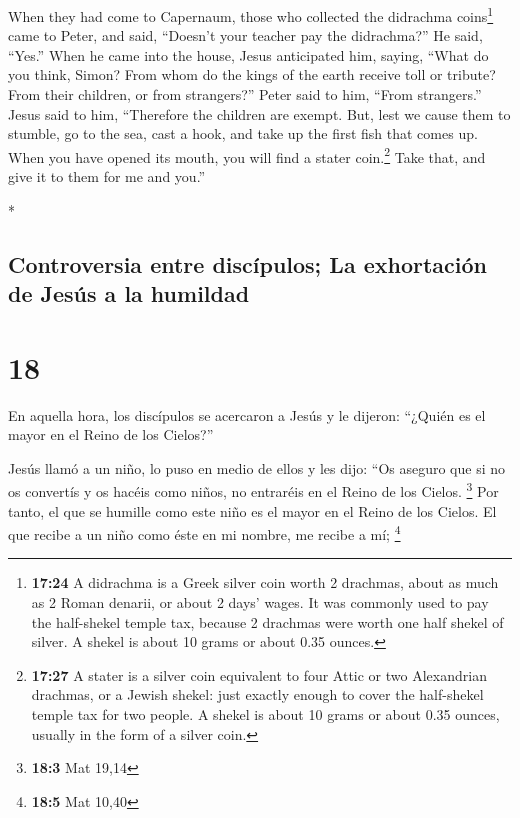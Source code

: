 \begin{paracol}{2}
\begin{otherlanguage}{english}
 When they had come to Capernaum, those who collected the
didrachma coins\footnote{\textbf{17:24} A didrachma is a Greek silver
  coin worth 2 drachmas, about as much as 2 Roman denarii, or about 2
  days' wages. It was commonly used to pay the half-shekel temple tax,
  because 2 drachmas were worth one half shekel of silver. A shekel is
  about 10 grams or about 0.35 ounces.} came to Peter, and said,
``Doesn't your teacher pay the didrachma?''  He said,
``Yes.'' When he came into the house, Jesus anticipated him, saying,
``What do you think, Simon? From whom do the kings of the earth receive
toll or tribute? From their children, or from strangers?''
 Peter said to him, ``From strangers.'' Jesus said to
him, ``Therefore the children are exempt.  But, lest we
cause them to stumble, go to the sea, cast a hook, and take up the first
fish that comes up. When you have opened its mouth, you will find a
stater coin.\footnote{\textbf{17:27} A stater is a silver coin
  equivalent to four Attic or two Alexandrian drachmas, or a Jewish
  shekel: just exactly enough to cover the half-shekel temple tax for
  two people. A shekel is about 10 grams or about 0.35 ounces, usually
  in the form of a silver coin.} Take that, and give it to them for me
and you.''

\end{otherlanguage}

\switchcolumn[0]*

\hypertarget{controversia-entre-discuxedpulos-la-exhortaciuxf3n-de-jesuxfas-a-la-humildad}{%
\subsection{Controversia entre discípulos; La exhortación de Jesús a la
humildad}\label{controversia-entre-discuxedpulos-la-exhortaciuxf3n-de-jesuxfas-a-la-humildad}}

\hypertarget{section-34}{%
\section{18}\label{section-34}}

 En aquella hora, los discípulos se acercaron a Jesús y le
dijeron: ``¿Quién es el mayor en el Reino de los Cielos?''

 Jesús llamó a un niño, lo puso en medio de ellos
 y les dijo: ``Os aseguro que si no os convertís y os
hacéis como niños, no entraréis en el Reino de los Cielos. \footnote{\textbf{18:3}
  Mat 19,14}  Por tanto, el que se humille como este niño
es el mayor en el Reino de los Cielos.  El que recibe a un
niño como éste en mi nombre, me recibe a mí; \footnote{\textbf{18:5} Mat
  10,40}


\end{paracol}
